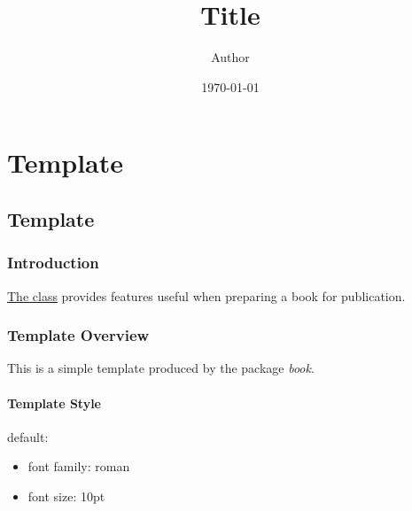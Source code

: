 \documentclass{book}
\title{Title}
\author{Author}
\date{\today}
\providecommand{\tightlist}{
\setlength{\itemsep}{0pt}\setlength{\parskip}{0pt}}
\begin{document}
\maketitle
\tableofcontents
\newpage
\part{Template}
\chapter{Template}
\section{Introduction}
{
\href{https://ctan.org/pkg/book}{The class} provides features useful when preparing a book for publication.
}
\section{Template Overview}
{
This is a simple template produced by the package \textit{book}.
}
\subsection{Template Style}
{
default:

\begin{itemize}
\tightlist
\item
font family: roman
\item
font size: 10pt
\end{itemize}
}
\end{document}

